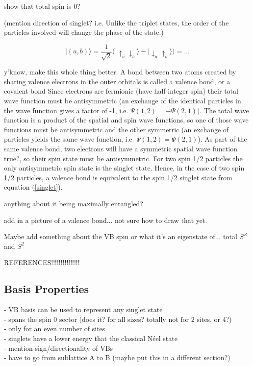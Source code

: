   {\color{red} show that total spin is 0?
  
  (mention direction of singlet? i.e. Unlike the triplet states, the order of the particles involved will change the phase of the state.)

\begin{equation}
   \lvert(a,b)\rangle = \frac{1}{\sqrt{2}}\big( \lvert \uparrow_a \downarrow_b \rangle - \lvert \downarrow_a \uparrow_b \rangle \big) = ...
   \label{eqn_vb}
\end{equation}
}

{\color{red} y'know, make this whole thing better.}
A bond between two atoms created by sharing valence electrons in the outer orbitals is called a valence bond, or a covalent bond \cite{Slater1931,Pauling1933} 
Since electrons are fermionic (have half integer spin) their total
wave function must be antisymmetric (an exchange of the identical particles in the wave function
gives a factor of -1, i.e. $\Psi(1,2) = -\Psi(2,1)$).
The total wave function is a product of the spatial and spin wave functions, so one of those wave functions must be antisymmetric and the other symmetric (an exchange of particles yields the same wave function, i.e. $\Psi(1,2) = \Psi(2,1)$).
As part of the same valence bond, two electrons will have a symmetric spatial wave function {\color{red} true?}, so their spin state must be antisymmetric.  For two spin 1/2 particles the only antisymmetric spin state is the singlet state.  
Hence, in the case of two spin 1/2 particles, a valence bond is equivalent to the spin 1/2 singlet state from equation (\ref{singlet}).

{\color{red} anything about it being maximally entangled?}

{\color{red} add in a picture of a valence bond... not sure how to draw that yet.

 Maybe add something about the VB spin or what it's an eigenstate of... total 
$S^Z$ and $S^2$

REFERENCES!!!!!!!!!!!!!!!
}

\subsection{Basis Properties}

- VB basis can be used to represent any singlet state\\
- spans the spin 0 sector (does it?  for all sizes? totally not for 2 sites. or 4?)\\
- only for an even number of sites\\
- singlets have a lower energy that the classical N\'eel state\\
- mention sign/directionality of VBs\\
- have to go from sublattice A to B (maybe put this in a different section?)\\

